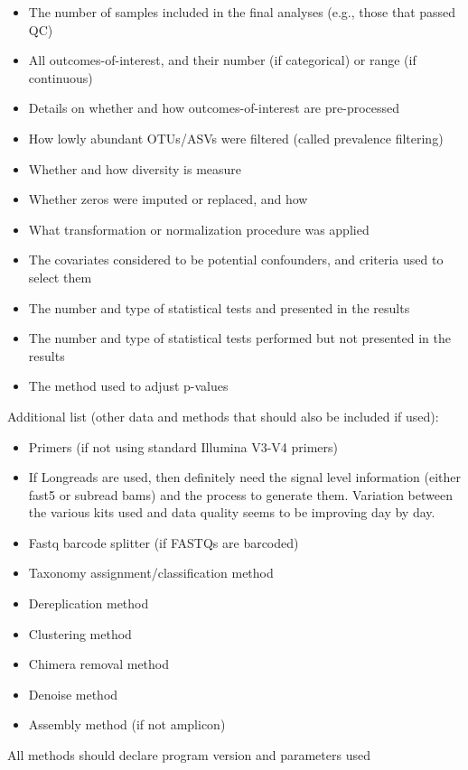 \documentclass{drexelthesis}
\begin{document}
{\begin{itemize}
\item The number of samples included in the final analyses (e.g., those that passed QC)
\item All outcomes-of-interest, and their number (if categorical) or range (if continuous)
\item Details on whether and how outcomes-of-interest are pre-processed
\item How lowly abundant OTUs/ASVs were filtered (called prevalence filtering)
\item Whether and how diversity is measure
\item Whether zeros were imputed or replaced, and how
\item What transformation or normalization procedure was applied
\item The covariates considered to be potential confounders, and criteria used to select them
\item The number and type of statistical tests and presented in the results
\item The number and type of statistical tests performed but not presented in the results
\item The method used to adjust p-values
\end{itemize}

Additional list (other data and methods that should also be included if used):

\begin{itemize}
\item Primers (if not using standard Illumina V3-V4 primers)
\item If Longreads are used, then definitely need the signal level information (either fast5 or subread bams) and the process to generate them. Variation between the various kits used and data quality seems to be improving day by day.
\item Fastq barcode splitter (if FASTQs are barcoded)
\item Taxonomy assignment/classification method
\item Dereplication method
\item Clustering method
\item Chimera removal method
\item Denoise method
\item Assembly method (if not amplicon)
\end{itemize}

All methods should declare program version and parameters used
}
\end{document}
